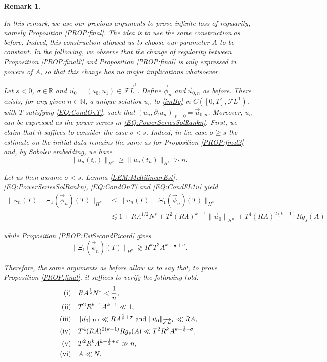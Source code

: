 \documentclass[letterpaper, 11pt,  reqno]{amsart}
\newtheorem{remark}[theorem]{Remark}
\newcommand{\1}{\hspace{0.5mm}\text{I}\hspace{0.5mm}}
\newcommand{\noi}{\noindent}
\newcommand{\R}{\mathbb{R}}
\newcommand{\NB}{\mathbb{N}}
\newcommand{\FL}{\mathcal{F}L} %
\newcommand{\FLv}{\overrightarrow{\mathcal{F}L}}
\renewcommand{\H}{\mathcal{H}}
\newcommand{\s}{\sigma}
\newcommand{\dt}{\partial_t}
\newcommand{\les}{\lesssim}
\newcommand{\ges}{\gtrsim}
\numberwithin{equation}{section}
\numberwithin{theorem}{section}
\begin{document}
\begin{remark} \rm
\label{REM:ILOR}

In this remark, we use our previous arguments to prove infinite loss of regularity, namely Proposition \ref{PROP:final}. The idea is to use the same construction as before. Indeed, this construction allowed us to choose our parameter $A$ to be constant. In the following, we observe that the change of regularity between Proposition \ref{PROP:final2} and Proposition \ref{PROP:final} is only expressed in powers of $A$, so that this change has no major implications whatsoever.

Let $s < 0$, $\s \in \R$ and $\vec{u}_0 = ( u_0, u_1) \in \FLv^1$. Define $\vec{\phi}_n$ and $\vec{u}_{0,n}$ as before. There exists, for any given $n \in \NB$, a unique solution $u_n$ to \eqref{imBq} in $C([0,T], \FL^1)$, with $T$ satisfying \eqref{EQ:CondOnT}, such that $(u_n , \dt u_n)|_{t=0} = \vec{u}_{0,n}$. Moreover, $u_n$ can be expressed as the power series in \eqref{EQ:PowerSeriesSolRankn}. First, we claim that it suffices to consider the case $\s < s$. Indeed, in the case $\s \geq s$ the estimate on the initial data remains the same as for Proposition \ref{PROP:final2} and, by Sobolev embedding, we have 
$$
\| u_n (t_n) \|_{H^\s} \geq \| u_n (t_n) \|_{H^s} > n.
$$

Let us then assume $\s < s$. Lemma \ref{LEM:MultilinearEst}, \eqref{EQ:PowerSeriesSolRankn}, \eqref{EQ:CondOnT} and \eqref{EQ:CondFL1u} yield
\begin{align*}
\| u_n(T) - \Xi_1(\vec{\phi}_n) (T) \|_{H^\s} & \leq \| u_n(T) - \Xi_1(\vec{\phi}_n) (T) \|_{H^s} \\
	& \les 1 + RA^{1/2} N^s + T^2 (RA)^{k-1} \| \vec{u}_0 \|_{\H^0}  +  T^4 (RA)^{2(k-1)} R g_s (A)
\end{align*}

\noi while Proposition \ref{PROP:EstSecondPicard} gives
$$
\| \Xi_1 (\vec{\phi}_n) (T) \|_{ H^\s} \ges R^k T^2 A^{k - \frac 12 + \s}.
$$

\noi Therefore, the same arguments as before allow us to say that, to prove Proposition \ref{PROP:final}, it suffices to verify the following hold:
\begin{align*}
\textup{(i)} & \quad RA^{\frac 12} N^s < \frac 1n, \\
\textup{(ii)} & \quad T^2 R^{k-1} A^{k-1} \ll 1, \\
\textup{(iii)} & \quad \| \vec{u}_0 \|_{\H^0} \ll R A^{\frac 12 + \s} \text{ and } \| \vec{u}_0\|_{\FLv^1} \ll RA, \\
\textup{(iv)} & \quad T^4  (RA)^{2(k-1)} R g_s (A) \ll T^2 R^k A^{k - \frac 12 + \s}, \\
\textup{(v)} & \quad T^2 R^k A^{k - \frac 12 + \s} \gg n, \\
\textup{(vi)} & \quad A \ll N.
\end{align*}


\end{remark}
\end{document}
